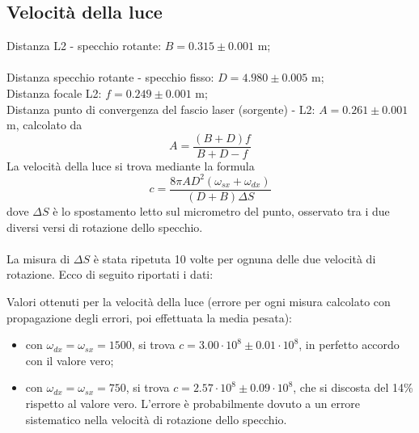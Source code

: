 \subsection{Velocità della luce}

Distanza L2 - specchio rotante:	$B = 0.315 \pm 0.001$ m;\\\\
%
%
Distanza specchio rotante - specchio fisso:	$D = 4.980 \pm 0.005$ m;\\
%
Distanza focale L2:	$f = 0.249 \pm 0.001$ m;\\
%
Distanza punto di convergenza del fascio laser (sorgente) - L2: $A = 0.261 \pm 0.001$ m, calcolato da
$$ A = \frac{(B+D)f}{B+D-f} $$
%
La velocità della luce si trova mediante la formula
$$ c = \frac{8 \pi A D^2 (\omega_{sx} + \omega_{dx})}{(D+B) \Delta S} $$
%
dove $\Delta S$ è lo spostamento letto sul micrometro del punto, osservato tra i due diversi versi di rotazione dello specchio.\\\\
%
La misura di $\Delta S$ è stata ripetuta 10 volte per ognuna delle due velocità di rotazione. Ecco di seguito riportati i dati:


%
Valori ottenuti per la velocità della luce (errore per ogni misura calcolato con propagazione degli errori, poi effettuata la media pesata):
\begin{itemize}
    \item con $\omega_{dx} = \omega_{sx} = 1500 $, si trova $ c = 3.00 \cdot 10^8 \pm 0.01 \cdot 10^8 $, in perfetto accordo con il valore vero;
    \item con $\omega_{dx} = \omega_{sx} = 750 $, si trova $ c = 2.57 \cdot 10^8 \pm 0.09 \cdot 10^8 $, che si discosta del 14\% rispetto al valore vero. L'errore è probabilmente dovuto a un errore sistematico nella velocità di rotazione dello specchio. 
\end{itemize}
 

